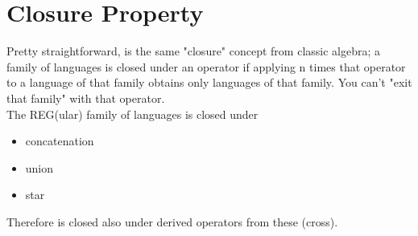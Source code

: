     \section{Closure Property}
        Pretty straightforward, is the same "closure" concept from classic algebra; a family of languages is closed under an operator if applying n times that operator to a language of that family obtains only languages of that family. You can't "exit that family" with that operator.\\
        The REG(ular) family of languages is closed under
        \begin{itemize}
            \item concatenation
            \item union
            \item star
        \end{itemize}
        Therefore is closed also under derived operators from these (cross).